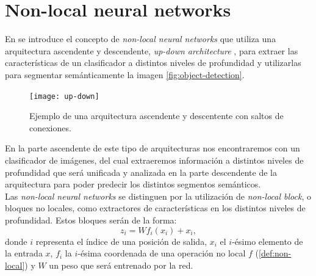 
\chapter{Non-local neural networks} \label{def:non-local-block}

En \cite{DBLP:journals/corr/abs-1711-07971} se introduce el concepto de \emph{non-local neural networks} que utiliza una arquitectura ascendente y descendente, \emph{up-down architecture} \cite{2016arXiv160308695P}, para extraer las características de un clasificador a distintos niveles de profundidad y utilizarlas para segmentar semánticamente la imagen \autoref{fig:object-detection}.\newline

\begin{figure}[htpb]
  \centering
  \texttt{[image: up-down]}
  \caption{Ejemplo de una arquitectura ascendente y descentente con saltos de conexiones\cite{2016arXiv160308695P}.}
  \label{fig:up-down}
\end{figure}


En la parte ascendente de este tipo de arquitecturas nos encontraremos con un clasificador de imágenes, del cual extraeremos información a distintos niveles de profundidad que será unificada y analizada en la parte descendente de la arquitectura para poder predecir los distintos segmentos semánticos. \\

Las \emph{non-local neural networks} se distinguen por la utilización de \emph{non-local block}, o bloques no locales, como extractores de características en los distintos niveles de profundidad. Estos bloques serán de la forma: $$z_i=W f_i(x_i) + x_i,$$  donde $i$ representa el índice de una posición de salida, $x_i$ el $i$-ésimo elemento de la entrada $x$, $f_i$ la $i$-ésima coordenada de una operación no local $f$ (\autoref{def:non-local}) y $W$ un peso que será entrenado por la red. \\


